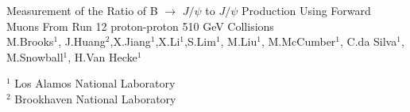 \documentclass[12pt]{article}
\newcommand{\pt}{$p_{T}$ }
\newcommand{\jpsi}{$J/\psi$ }
\begin{document}
\begin{titlepage}
\begin{center}
 {\LARGE Measurement of the Ratio of B $\to$ \jpsi to \jpsi Production Using Forward Muons From Run 12 proton-proton 510 GeV Collisions} \\
\vspace{15mm}
M.Brooks$^{\mbox{1}}$, J.Huang$^{\mbox{2}}$,X.Jiang$^{\mbox{1}}$,X.Li$^{\mbox{1}}$,S.Lim$^{\mbox{1}}$, M.Liu$^{\mbox{1}}$, M.McCumber$^{\mbox{1}}$, C.da Silva$^{\mbox{1}}$, M.Snowball$^{\mbox{1}}$, H.Van Hecke$^{\mbox{1}}$

\vspace{1cm}

$^{\mbox{1}}$ Los Alamos National Laboratory \\
$^{\mbox{2}}$ Brookhaven National Laboratory  \\
\end{center}

\vspace{2cm}
\date{today}

\vspace{2cm}




\begin{abstract}

With the addition of the Forward Vertex detector to the PHENIX experiment, it is now possible to precisely measure the vertex position in 
both heavy ion and proton-proton events.  This precision gives the ability to measure the Distance of Closest Approach of all tracks to
the precisely measured vertex, allowing one to discern prompt muons from heavy flavor decays that fly some distance before decaying.
In this paper, Run 12 proton-proton collisions at $\sqrt{s} = $ 510 GeV from the PHENIX experiment will be analyzed using the DCA to 
discriminate between B $\to$ \jpsi and prompt \jpsi's decaying into muons Finally, a ratio of B to \jpsi production by \pt is presented.

\end{abstract}

\end{titlepage}
\end{document}
